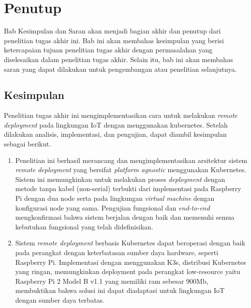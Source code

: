\chapter{Penutup}

Bab Kesimpulan dan Saran akan menjadi bagian akhir dan penutup dari penelitian tugas akhir ini. Bab ini akan membahas kesimpulan yang berisi ketercapaian tujuan penelitian tugas akhir dengan permasalahan yang diselesaikan dalam penelitian tugas akhir. Selain itu, bab ini akan membahas saran yang dapat dilakukan untuk pengembangan atau penelitian selanjutnya.

\section{Kesimpulan}
Penelitian tugas akhir ini mengimplementasikan cara untuk melakukan \textit{remote deployment} pada lingkungan IoT dengan menggunakan kubernetes. Setelah dilakukan analisis, implementasi, dan pengujian, dapat diambil kesimpulan sebagai berikut.
\begin{enumerate}
  \item  Penelitian ini berhasil merancang dan mengimplementasikan arsitektur sistem \textit{remote deployment} yang bersifat \textit{platform agnostic} menggunakan Kubernetes. Sistem ini memungkinkan untuk melakukan proses \textit{deployment} dengan metode tanpa kabel (non-serial) terbukti dari implementasi pada Raspberry Pi dengan dua node serta pada lingkungan \textit{virtual machine} dengan konfigurasi node yang sama. Pengujian fungsional dan \textit{end-to-end} mengkonfirmasi bahwa sistem berjalan dengan baik dan memenuhi semua kebutuhan fungsional yang telah didefinisikan.
  \item Sistem \textit{remote deployment} berbasis Kubernetes dapat beroperasi dengan baik pada perangkat dengan keterbatasan sumber daya hardware, seperti Raspberry Pi. Implementasi dengan menggunakan K3s, distribusi Kubernetes yang ringan, memungkinkan deployment pada perangkat low-resource yaitu Raspberry Pi 2 Model B v1.1 yang memiliki ram sebesar 900Mb, membuktikan bahwa solusi ini dapat diadaptasi untuk lingkungan IoT dengan sumber daya terbatas.
\end{enumerate}

